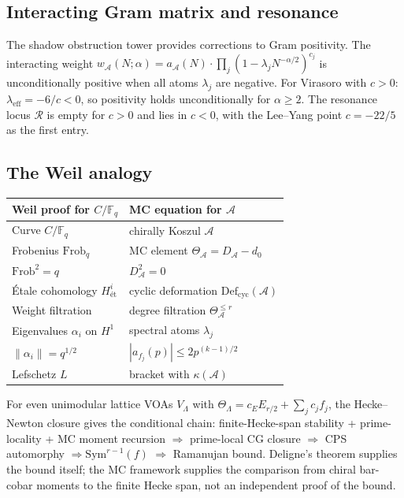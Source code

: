 \documentclass[11pt]{report}
\theoremstyle{definition}
\theoremstyle{remark}
\providecommand{\cA}{\mathcal{A}}
\providecommand{\Sym}{\mathrm{Sym}}
\providecommand{\cR}{\mathcal{R}}
\providecommand{\bF}{\mathbb{F}}
\providecommand{\Defcyc}{\mathrm{Def}_{\mathrm{cyc}}}
\numberwithin{equation}{section}
\begin{document}
\subsection*{Interacting Gram matrix and resonance}

The shadow obstruction tower provides corrections to Gram
positivity. The interacting weight
$w_\cA(N;\alpha) = a_\cA(N)\cdot\prod_j(1 - \lambda_j N^{-\alpha/2})^{c_j}$
is unconditionally positive when all atoms $\lambda_j$ are
negative. For Virasoro with $c > 0$:
$\lambda_{\mathrm{eff}} = -6/c < 0$, so positivity holds
unconditionally for $\alpha \ge 2$. The resonance locus $\cR$
is empty for $c > 0$ and lies in $c < 0$, with the Lee--Yang
point $c = -22/5$ as the first entry.

\subsection*{The Weil analogy}

\begin{center}
\small
\renewcommand{\arraystretch}{1.1}
\begin{tabular}{ll}
\textbf{Weil proof for $C/\bF_q$} & \textbf{MC equation for $\cA$}\\ \hline
Curve $C/\bF_q$ & chirally Koszul $\cA$\\
Frobenius $\mathrm{Frob}_q$ & MC element $\Theta_\cA = D_\cA - d_0$\\
$\mathrm{Frob}^2 = q$ & $D_\cA^2 = 0$\\
\'Etale cohomology $H^i_{\text{\'et}}$ & cyclic deformation $\Defcyc(\cA)$\\
Weight filtration & degree filtration $\Theta_\cA^{\le r}$\\
Eigenvalues $\alpha_i$ on $H^1$ & spectral atoms $\lambda_j$\\
$\|\alpha_i\| = q^{1/2}$ & $|a_{f_j}(p)| \le 2p^{(k-1)/2}$\\
Lefschetz $L$ & bracket with $\kappa(\cA)$
\end{tabular}
\end{center}
For even unimodular lattice VOAs $V_\Lambda$ with
$\Theta_\Lambda = c_E E_{r/2} + \sum_j c_j f_j$, the
Hecke--Newton closure gives the conditional chain:
finite-Hecke-span stability + prime-locality + MC moment recursion
$\Rightarrow$ prime-local CG closure $\Rightarrow$ CPS automorphy
$\Rightarrow \Sym^{r-1}(f)$ $\Rightarrow$ Ramanujan bound.
Deligne's theorem supplies the bound itself; the MC framework
supplies the comparison from chiral bar-cobar moments to the finite
Hecke span, not an independent proof of the bound.
\end{document}
